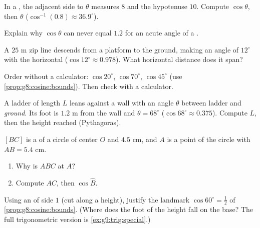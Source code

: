 \begin{exercise}[$\star$]\label{exo:g8:cosine:5}
In a , the adjacent side to $\theta$ measures $8$ and
the hypotenuse $10$. Compute $\cos\theta$, then $\theta$
($\cos^{-1}(0.8) \approx 36.9^\circ$).
\end{exercise}

\begin{exercise}[$\star$]\label{exo:g8:cosine:6}
Explain why $\cos\theta$ can never equal $1.2$ for an acute angle of
a .
\end{exercise}

\begin{exercise}[$\star\star$]\label{exo:g8:cosine:7}
A $25$ m zip line descends from a platform to the ground, making an
angle of $12^\circ$ with the horizontal ($\cos 12^\circ \approx
0.978$). What horizontal distance does it span?
\end{exercise}

\begin{exercise}[$\star\star$]\label{exo:g8:cosine:8}
Order without a calculator: $\cos 20^\circ$, $\cos 70^\circ$,
$\cos 45^\circ$ (use \cref{prop:g8:cosine:bounds}). Then check with a
calculator.
\end{exercise}

\begin{exercise}[$\star\star$]\label{exo:g8:cosine:9}
A ladder of length $L$ leans against a wall with an angle $\theta$
between ladder and \emph{ground}. Its foot is $1.2$ m from the wall
and $\theta = 68^\circ$ ($\cos 68^\circ \approx 0.375$). Compute $L$,
then the height reached (Pythagoras).
\end{exercise}

\begin{exercise}[$\star\star$]\label{exo:g8:cosine:10}
$[BC]$ is a  of a circle of center $O$ and  $4.5$ cm,
and $A$ is a point of the circle with $AB = 5.4$ cm.
\begin{enumerate}
  \item Why is $ABC$  at $A$?
  \item Compute $AC$, then $\cos \widehat B$.
\end{enumerate}
\end{exercise}

\begin{exercise}[$\star\star\star$]\label{exo:g8:cosine:11}
Using  an  of side $1$ (cut along a height),
justify the landmark $\cos 60^\circ = \frac12$ of
\cref{prop:g8:cosine:bounds}. (Where does the foot of the height
fall on the base? The full trigonometric version is
\cref{ex:g9:trig:special}.)
\end{exercise}

